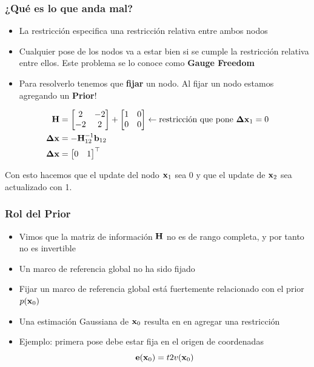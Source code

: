 \begin{frame}
	\frametitle{¿Qué es lo que anda mal?}
    
    \begin{itemize}
        \item La restricción especifica una restricción relativa entre ambos nodos
        \item Cualquier pose de los nodos va a estar bien si se cumple la restricción relativa entre ellos. Este problema se lo conoce como {\bf Gauge Freedom}
        \item Para resolverlo tenemos que {\bf fijar} un nodo. Al fijar un nodo estamos agregando un {\bf Prior}!
    \end{itemize}

    \begin{align*}
        \boldsymbol{\mathbf{H}} &=
        \begin{bmatrix}
            2 & -2\\
            -2 & 2
        \end{bmatrix}
        +
        \begin{bmatrix}
            1 & 0\\
            0 & 0
        \end{bmatrix} \leftarrow \text{restricción que pone } \boldsymbol{\mathbf{\Delta}}\boldsymbol{\mathbf{x}}_{1} = 0\\
        \boldsymbol{\mathbf{\Delta}}\boldsymbol{\mathbf{x}} &= -{\boldsymbol{\mathbf{H}}}^{-1}_{12} \boldsymbol{\mathbf{b}}_{12}\\
        \boldsymbol{\mathbf{\Delta}}\boldsymbol{\mathbf{x}} &=
        \begin{bmatrix}
            0 & 1
        \end{bmatrix}^{\top}
    \end{align*}
    
    Con esto hacemos que el update del nodo $\boldsymbol{\mathbf{x}}_{1}$ sea 0 y que el update de $\boldsymbol{\mathbf{x}}_{2}$ sea actualizado con 1.
\end{frame}

\begin{frame}
    \frametitle{Rol del Prior}
    
    \begin{itemize}
        \item Vimos que la matriz de información $\boldsymbol{\mathbf{H}}$ no es de rango completa, y por tanto no es invertible
        \item Un marco de referencia global no ha sido fijado
        \item Fijar un marco de referencia global está fuertemente relacionado con el prior $p(\boldsymbol{\mathbf{x}}_{0})$
        \item Una estimación Gaussiana de $\boldsymbol{\mathbf{x}}_{0}$ resulta en en agregar una restricción
        \item Ejemplo: primera pose debe estar fija en el origen de coordenadas
        \begin{equation*}
            \boldsymbol{\mathbf{e}}(\boldsymbol{\mathbf{x}}_{0}) = t2v(\boldsymbol{\mathbf{x}}_{0})
        \end{equation*}
    \end{itemize}
    
\end{frame}

